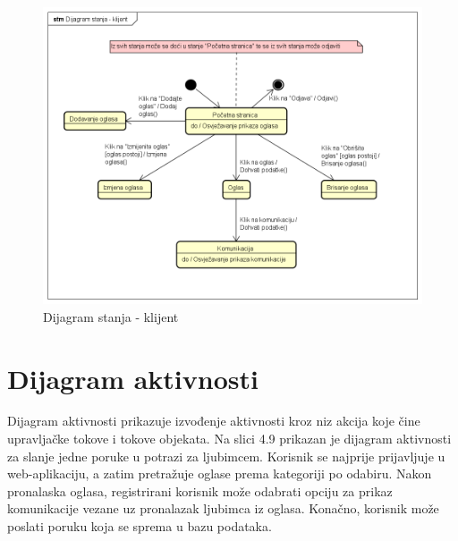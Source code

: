 			\begin{figure}[htb]
				\centering
				\includegraphics[width=\textwidth]{slike/Dijagram_stanja_-_klijent.png}
				\caption{Dijagram stanja - klijent}
			\end{figure}
			
			\eject 
		
		\section{Dijagram aktivnosti}
			
			\noindent Dijagram aktivnosti prikazuje izvođenje aktivnosti kroz niz akcija koje čine upravljačke tokove i tokove objekata. Na slici 4.9 prikazan je dijagram aktivnosti za slanje jedne poruke u potrazi za ljubimcem. Korisnik se najprije prijavljuje u web-aplikaciju, a zatim pretražuje oglase prema kategoriji po odabiru. Nakon pronalaska oglasa, registrirani korisnik može odabrati opciju za prikaz komunikacije vezane uz pronalazak ljubimca iz oglasa. Konačno, korisnik može poslati poruku koja se sprema u bazu podataka.
			
